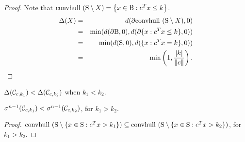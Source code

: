 \begin{proof}
Note that $\mbox{convhull }(\text{S} \setminus X)= \left\{x \in \text{B} : c^Tx \leq k \right\}$.
\begin{eqnarray}
\nonumber \Delta(X) &=& d(\partial \mbox{convhull }(\text{S} \setminus X), 0) \\
\nonumber &=& \min(d(\partial \text{B}, 0), d(\partial\{x : c^Tx \leq k\}, 0)) \\
\nonumber &=& \min(d(\text{S}, 0), d(\{x : c^Tx = k\}, 0)) \\
\nonumber &=& \min\left(1, \frac{|k|}{\|c\|}\right).
\end{eqnarray}
\end{proof}
%

\begin{corollary}\label{lemma:deltaMonotone}$\Delta(\mathcal{C}_{c,k_1}) < \Delta(\mathcal{C}_{c,k_2})$ when $k_1 < k_2$.
\end{corollary}

\begin{lemma}\label{lemma:muMonotone}$\sigma^{n-1}(\mathcal{C}_{c,k_1}) < \sigma^{n-1}(\mathcal{C}_{c,k_2})$, for $k_1 > k_2$.
\end{lemma}

\begin{proof}$\mbox{convhull }(\text{S} \setminus \{x\in \text{S}: c^Tx >k_1\}) \subseteq \mbox{convhull }(\text{S} \setminus \{x\in \text{S}: c^Tx >k_2\})$, for $k_1 > k_2$.
\end{proof}

